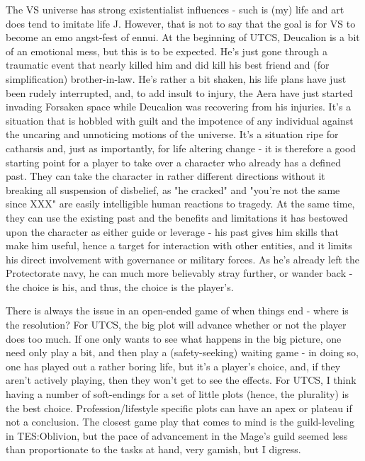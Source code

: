 The VS universe has strong existentialist influences - such is (my)
life and art does tend to imitate life J. However, that is not to say
that the goal is for VS to become an emo angst-fest of ennui. At the
beginning of UTCS, Deucalion is a bit of an emotional mess, but this
is to be expected. He's just gone through a traumatic event that
nearly killed him and did kill his best friend and (for
simplification) brother-in-law. He's rather a bit shaken, his life
plans have just been rudely interrupted, and, to add insult to injury,
the Aera have just started invading Forsaken space while Deucalion was
recovering from his injuries. It's a situation that is hobbled with
guilt and the impotence of any individual against the uncaring and
unnoticing motions of the universe. It's a situation ripe for
catharsis and, just as importantly, for life altering change - it is
therefore a good starting point for a player to take over a character
who already has a defined past. They can take the character in rather
different directions without it breaking all suspension of disbelief,
as "he cracked" and "you're not the same since XXX" are easily
intelligible human reactions to tragedy. At the same time, they can
use the existing past and the benefits and limitations it has bestowed
upon the character as either guide or leverage - his past gives him
skills that make him useful, hence a target for interaction with other
entities, and it limits his direct involvement with governance or
military forces. As he's already left the Protectorate navy, he can
much more believably stray further, or wander back - the choice is
his, and thus, the choice is the player's.

There is always the issue in an open-ended game of when things end -
where is the resolution? For UTCS, the big plot will advance whether
or not the player does too much. If one only wants to see what happens
in the big picture, one need only play a bit, and then play a
(safety-seeking) waiting game - in doing so, one has played out a
rather boring life, but it's a player's choice, and, if they aren't
actively playing, then they won't get to see the effects.  For UTCS, I
think having a number of soft-endings for a set of little plots
(hence, the plurality) is the best choice. Profession/lifestyle
specific plots can have an apex or plateau if not a conclusion. The
closest game play that comes to mind is the guild-leveling in
TES:Oblivion, but the pace of advancement in the Mage's guild seemed
less than proportionate to the tasks at hand, very gamish, but I
digress.

